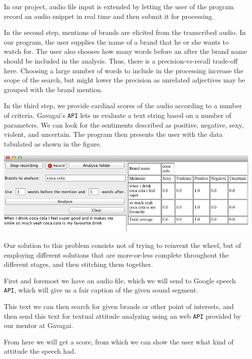 \documentclass[a4paper,12pt,twoside]{ltxdoc}
\begin{document}
In our project, audio file input is extended by letting the user of the program record an audio snippet in real time and
then submit it for processing.

In the second step, mentions of brands are elicited from the transcribed audio. In our program, the user supplies the name
of a brand that he or she wants to watch for. The user also chooses how many words before an after the brand name should
be included in the analysis. Thus, there is a precision-vs-recall trade-off here. Choosing a large number of words to include
in the processing increase the scope of the search, but might lower the precision as unrelated adjectives may be grouped
with the brand mention.

In the third step, we provide cardinal scores of the audio according to a number of criteria. Gavagai's \verb#API# lets us
evaluate a text string based on a number of parameters. We can look for the sentiments described as positive, negative, sexy, violent,
and uncertain. The program then presents the user with the data tabulated as shown in the figure. %

\begin{center}
\includegraphics[scale=0.6]{../poster/screenshot_crop.png}
\end{center}

Our solution to this problem consists not of trying to reinvent the wheel, but of employing different
solutions that are more-or-less complete throughout the different stages, and then stitching them together.

First and foremost we have an audio file, which we will send to Google speech \verb#API#, which will give us a fair caption of the given sound segment.

This text we can then search for given brands or other point of interests, and then send this text for textual attitude analyzing using an web \verb#API# provided by our mentor at Gavagai.

From here we will get a score, from which we can show the user what kind of attitude the speech had. 
\end{document}
